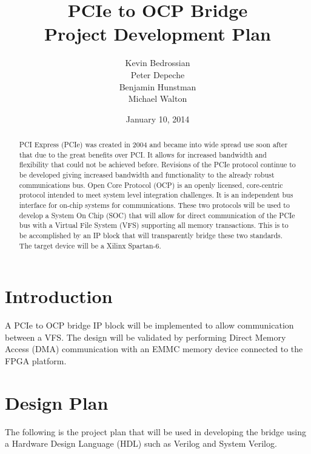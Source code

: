 \documentclass[a4paper]{report}   %
\begin{document}
\raggedright{}  %

\title{PCIe to OCP Bridge \\
  Project Development Plan
}   %

\author{Kevin Bedrossian \\
  Peter Depeche \\        %
  Benjamin Hunstman \\
  Michael Walton
}

\date{January 10, 2014}    %
\maketitle

\begin{abstract}
  PCI Express (PCIe) was created in 2004 and became into wide spread use soon after that due to the great benefits over PCI\@.
  It allows for increased bandwidth and flexibility that could not be achieved before\@.
  Revisions of the PCIe protocol continue to be developed giving increased bandwidth and functionality to the already robust communications bus\@.
  Open Core Protocol (OCP) is an openly licensed, core-centric protocol intended to meet system level integration challenges\@.
  It is an independent bus interface for on-chip systems for communications\@.
  These two protocols will be used to develop a System On Chip (SOC) that will allow for direct communication of the PCIe bus with a Virtual File System (VFS) supporting all memory transactions\@.
  This is to be accomplished by an IP block that will transparently bridge these two standards. The target device will be a Xilinx Spartan-6.
\end{abstract}

\tableofcontents

\chapter{Introduction}
A PCIe to OCP bridge IP block will be implemented to allow communication between a VFS\@.
The design will be validated by performing Direct Memory Access (DMA) communication with an EMMC memory device connected to the FPGA platform.

\chapter{Design Plan}
The following is the project plan that will be used in developing the bridge using a Hardware Design Language (HDL) such as Verilog and System Verilog.
\linebreak
\end{document}
